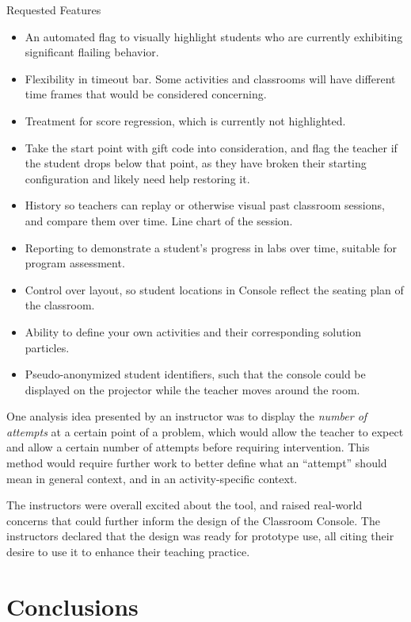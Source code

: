 Requested Features
\begin{itemize}
\item An automated flag to visually highlight students who are currently exhibiting significant flailing behavior.
\item Flexibility in timeout bar. Some activities and classrooms will have different time frames that would be considered concerning.
\item Treatment for score regression, which is currently not highlighted. 
\item Take the start point with gift code into consideration, and flag the teacher if the student drops below that point, as they have broken their starting configuration and likely need help restoring it.
\item History so teachers can replay or otherwise visual past classroom sessions, and compare them over time. Line chart of the session.
\item Reporting to demonstrate a student's progress in labs over time, suitable for program assessment. 
\item Control over layout, so student locations in Console reflect the seating plan of the classroom.
\item Ability to define your own activities and their corresponding solution particles.
\item Pseudo-anonymized student identifiers, such that the console could be displayed on the projector while the teacher moves around the room.
\end{itemize}

One analysis idea presented by an instructor was to display the \emph{number of attempts} at a certain point of a problem, which would allow the teacher to expect and allow a certain number of attempts before requiring intervention. This method would require further work to better define what an ``attempt'' should mean in general context, and in an activity-specific context.

The instructors were overall excited about the tool, and raised real-world concerns that could further inform the design of the Classroom Console. The instructors declared that the design was ready for prototype use, all citing their desire to use it to enhance their teaching practice.

\section{Conclusions}

